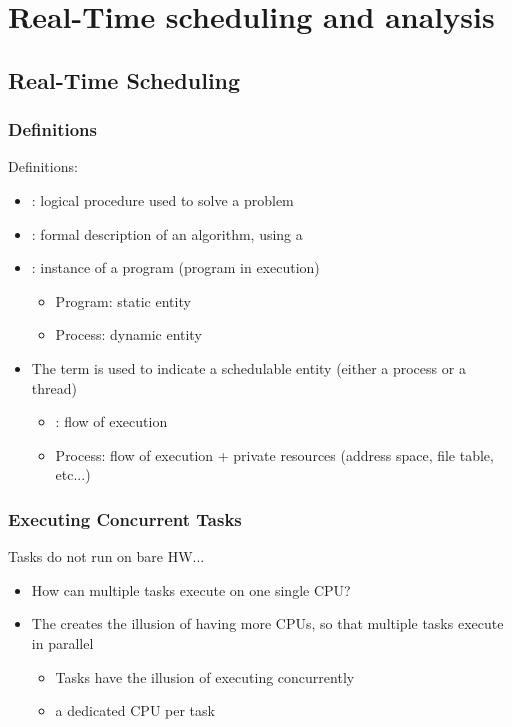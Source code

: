 \chapter{Real-Time scheduling and analysis}

\section{Real-Time Scheduling}
\subsection{Definitions}
Definitions:
\begin{itemize}
\item {}: logical procedure used to solve a problem
\item {}: formal description of an algorithm, using a 
\item {}: instance of a program (program in execution)
\begin{itemize}
\item Program: static entity
\item Process: dynamic entity
\end{itemize}
\item The term  is used to indicate a schedulable entity (either a process or a thread)
\begin{itemize}
\item {}: flow of execution
\item Process: flow of execution + private resources (address space, file table, etc...)
\end{itemize}
\end{itemize}

\subsection{Executing Concurrent Tasks}
Tasks do not run on bare HW...
\begin{itemize}
\item How can multiple tasks execute on one single CPU?
\item The  creates the illusion of having more CPUs, so that multiple tasks execute in parallel
\begin{itemize}
\item Tasks have the illusion of executing concurrently
\item a dedicated CPU per task
\end{itemize}
\end{itemize}

